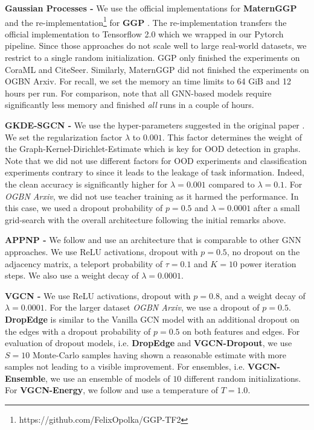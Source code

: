 \textbf{Gaussian Processes - } We use the official implementations for \textbf{MaternGGP} \citep{Borovitskiy2020} and the re-implementation\footnote{https://github.com/FelixOpolka/GGP-TF2} for \textbf{GGP} \citep{Ng2018}. The re-implementation transfers the official implementation to Tensorflow 2.0 \citep{tensorflow} which we wrapped in our Pytorch pipeline. Since those approaches do not scale well to large real-world datasets, we restrict to a single random initialization. GGP only finished the experiments on CoraML and CiteSeer. Similarly, MaternGGP did not finished the experiments on OGBN Arxiv. For recall, we set the memory an time limits to 64 GiB and 12 hours per run. For comparison, note that all GNN-based models require significantly less memory and finished \emph{all} runs in a couple of hours.

\textbf{GKDE-SGCN - } We use the hyper-parameters suggested in the original paper \citep{Zhao2020}. We set the regularization factor $\lambda$ to $0.001$. This factor determines the weight of the Graph-Kernel-Dirichlet-Estimate which is key for OOD detection in graphs. Note that we did not use different factors for OOD experiments and classification experiments contrary to \citep{Zhao2020} since it leads to the leakage of task information. Indeed, the clean accuracy is significantly higher for $\lambda=0.001$ compared to $\lambda=0.1$. For \emph{OGBN Arxiv}, we did not use teacher training as it harmed the performance. In this case, we used a dropout probability of $p=0.5$ and $\lambda = 0.0001$ after a small grid-search with the overall architecture following the initial remarks above.

\textbf{APPNP - } We follow \citep{Klicpera2019} and use an architecture that is comparable to other GNN approaches. We use ReLU activations, dropout with $p=0.5$, no dropout on the adjacency matrix, a teleport probability of $\tau = 0.1$ and $K=10$ power iteration steps. We also use a weight decay of $\lambda = 0.0001$.

\textbf{VGCN - } We use ReLU activations, dropout with $p=0.8$, and a weight decay of $\lambda = 0.0001$. For the larger dataset \emph{OGBN Arxiv}, we use a dropout of $p=0.5$. \textbf{DropEdge} is similar to the Vanilla GCN model with an additional dropout on the edges with a dropout probability of $p=0.5$ on both features and edges. For evaluation of dropout models, i.e. \textbf{DropEdge} and \textbf{VGCN-Dropout}, we use $S = 10$ Monte-Carlo samples having shown a reasonable estimate with more samples not leading to a visible improvement. For ensembles, i.e. \textbf{VGCN-Ensemble}, we use an ensemble of models of $10$ different random initializations. For \textbf{VGCN-Energy}, we follow \citep{energy-ood} and use a temperature of $T = 1.0$.

